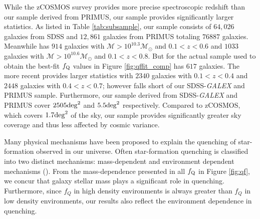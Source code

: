 \documentclass{emulateapj}
\begin{document}
While the zCOSMOS survey provides more precise spectroscopic redshift than our sample derived from PRIMUS, our sample provides significantly larger statistics. As listed in Table \ref{tab:subsample}, our sample consists of $64,026$ galaxies from SDSS and $12,861$ galaxies from PRIMUS totaling $76887$ galaxies. Meanwhile \cite{Iovino:2010aa} has $914$ galaxies with $\mathcal{M} > 10^{10.3} \mathcal{M}_{\odot}$ and $0.1 < z < 0.6$ and $1033$ galaxies with $\mathcal{M} > 10^{10.6} \mathcal{M}_{\odot}$ and $0.1 < z < 0.8$. But for the actual sample used to obtain the best-fit $f_{\rm{Q}}$ values in Figure \ref{fig:qffit_comp} \cite{Iovino:2010aa} has $617$ galaxies. The more recent \cite{Kovac:2014aa} provides larger statistics with $2340$ galaxies with $0.1 < z < 0.4$ and $2448$ galaxies with $0.4 < z < 0.7$; however falls short of our SDSS-{\em GALEX} and PRIMUS sample. Furthermore, our sample derived from SDSS-{\em GALEX} and PRIMUS cover $2505 \rm{deg}^2$ and $5.5 \rm{deg}^2$ respectively. Compared to zCOSMOS, which covers $1.7 \rm{deg}^2$ of the sky, our sample provides significantly greater sky coverage and thus less affected by cosmic variance. 

Many physical mechanisms have been proposed to explain the quenching of star-formation observed in our universe. Often star-formation quenching is classified into two distinct mechanisms: mass-dependent and environment dependent mechanisms (\citealt{Baldry:2006aa, Peng:2010aa}). From the mass-dependence presented in all $f_{\rm{Q}}$ in Figure \ref{fig:qf}, we concur that galaxy stellar mass plays a significant role in quenching. Furthermore, since $f_Q$ in high density environments is always greater than $f_Q$ in low density environments, our results also reflect the environment dependence in quenching. %

\end{document}
